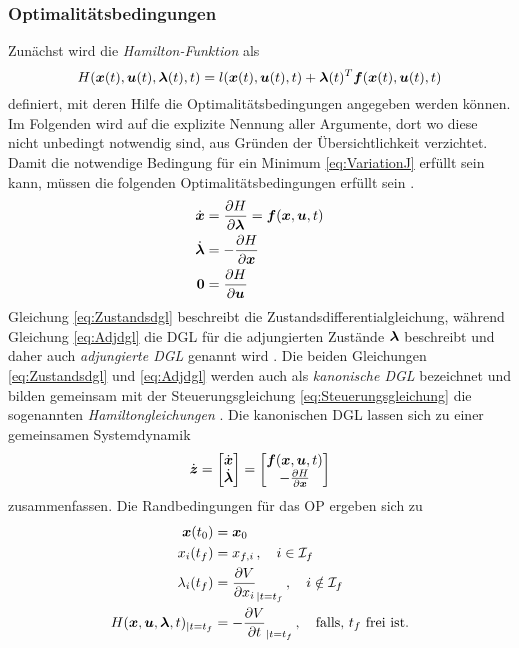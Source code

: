 \subsubsection{Optimalitätsbedingungen}\label{subsubsec:Optimalitätsbedingungen}
Zunächst wird die \textit{Hamilton-Funktion} als 
\begin{equation}
	H(\boldsymbol{x}(t),\boldsymbol{u}(t),\boldsymbol{\lambda}(t),t) = l(\boldsymbol{x}(t),\boldsymbol{u}(t),t) + \boldsymbol{\lambda}(t)^T\boldsymbol{f}(\boldsymbol{x}(t),\boldsymbol{u}(t),t) \label{eq:Hamilton}
\end{equation}
definiert, mit deren Hilfe die Optimalitätsbedingungen angegeben werden können. Im Folgenden wird auf die explizite Nennung aller Argumente, dort wo diese nicht unbedingt notwendig sind, aus Gründen der Übersichtlichkeit verzichtet. Damit die notwendige Bedingung für ein Minimum \eqref{eq:VariationJ} erfüllt sein kann, müssen die folgenden Optimalitätsbedingungen erfüllt sein \cite{KnutGraichen.2012}.
\begin{align}
	\dot{\boldsymbol{x}} &= \frac{\partial H}{\partial\boldsymbol{\lambda}} = \boldsymbol{f}(\boldsymbol{x},\boldsymbol{u},t) \label{eq:Zustandsdgl} \\
	\dot{\boldsymbol{\lambda}} &= -\frac{\partial H}{\partial \boldsymbol{x}} \label{eq:Adjdgl} \\
	\boldsymbol{0} &= \frac{\partial H}{\partial \boldsymbol{u}} \label{eq:Steuerungsgleichung} 
\end{align}
Gleichung \eqref{eq:Zustandsdgl} beschreibt die Zustandsdifferentialgleichung, während Gleichung \eqref{eq:Adjdgl} die \gls{DGL} für die adjungierten Zustände $\boldsymbol{\lambda}$ beschreibt und daher auch \textit{adjungierte \gls{DGL}} genannt wird \cite{Konigorski.2019}. Die beiden Gleichungen \eqref{eq:Zustandsdgl} und \eqref{eq:Adjdgl} werden auch als \textit{kanonische \gls{DGL}} bezeichnet und bilden gemeinsam mit der Steuerungsgleichung \eqref{eq:Steuerungsgleichung} die sogenannten \textit{Hamiltongleichungen} \cite{Konigorski.2019}. Die kanonischen \gls{DGL} lassen sich zu einer gemeinsamen Systemdynamik 
\begin{equation}
	\dot{\boldsymbol{z}} = \begin{bmatrix}
	\dot{\boldsymbol{x}} \\
	\dot{\boldsymbol{\lambda}}
	\end{bmatrix} = 
	\begin{bmatrix}
	\boldsymbol{f}(\boldsymbol{x},\boldsymbol{u},t) \\
	-\frac{\partial H}{\partial \boldsymbol{x}}
	\end{bmatrix} \label{eq:Sysdyn_z}
\end{equation}
zusammenfassen.
Die Randbedingungen für das \gls{OP} ergeben sich zu \cite{KnutGraichen.2012}
\begin{align}
\boldsymbol{x}(t_0) &= \boldsymbol{x}_0 \label{eq:Anfangswerte} \\
x_i(t_f) &= x_{f,i}\,, \quad i \in\mathcal{I}_f \label{eq:Endwerte} \\
\lambda_i(t_f) &= \frac{\partial V}{\partial x_i}_{|t=t_f}\,, \quad i \notin \mathcal{I}_f \label{eq:Lambdaend} \\
H(\boldsymbol{x},\boldsymbol{u},\boldsymbol{\lambda},t)_{|t=t_f} &= -\frac{\partial V}{\partial t}_{|t=t_f}\,,\quad \textrm{falls, $t_f$ frei ist.} \label{eq:Transversalitaet}
\end{align}
